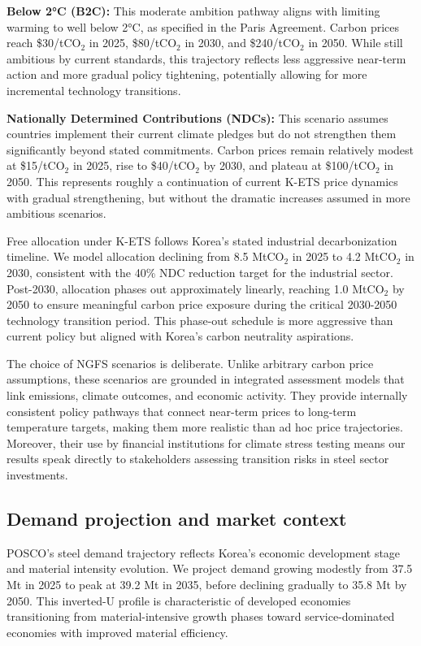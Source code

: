 \documentclass[preprint,1p,authoryear]{elsarticle}
\begin{document}
\textbf{Below 2°C (B2C):} This moderate ambition pathway aligns with limiting warming to well below 2°C, as specified in the Paris Agreement. Carbon prices reach \$30/tCO$_2$ in 2025, \$80/tCO$_2$ in 2030, and \$240/tCO$_2$ in 2050. While still ambitious by current standards, this trajectory reflects less aggressive near-term action and more gradual policy tightening, potentially allowing for more incremental technology transitions.

\textbf{Nationally Determined Contributions (NDCs):} This scenario assumes countries implement their current climate pledges but do not strengthen them significantly beyond stated commitments. Carbon prices remain relatively modest at \$15/tCO$_2$ in 2025, rise to \$40/tCO$_2$ by 2030, and plateau at \$100/tCO$_2$ in 2050. This represents roughly a continuation of current K-ETS price dynamics with gradual strengthening, but without the dramatic increases assumed in more ambitious scenarios.

Free allocation under K-ETS follows Korea's stated industrial decarbonization timeline. We model allocation declining from 8.5 MtCO$_2$ in 2025 to 4.2 MtCO$_2$ in 2030, consistent with the 40\% NDC reduction target for the industrial sector. Post-2030, allocation phases out approximately linearly, reaching 1.0 MtCO$_2$ by 2050 to ensure meaningful carbon price exposure during the critical 2030-2050 technology transition period. This phase-out schedule is more aggressive than current policy but aligned with Korea's carbon neutrality aspirations.

The choice of NGFS scenarios is deliberate. Unlike arbitrary carbon price assumptions, these scenarios are grounded in integrated assessment models that link emissions, climate outcomes, and economic activity. They provide internally consistent policy pathways that connect near-term prices to long-term temperature targets, making them more realistic than ad hoc price trajectories. Moreover, their use by financial institutions for climate stress testing means our results speak directly to stakeholders assessing transition risks in steel sector investments.

\subsection{Demand projection and market context}

POSCO's steel demand trajectory reflects Korea's economic development stage and material intensity evolution. We project demand growing modestly from 37.5 Mt in 2025 to peak at 39.2 Mt in 2035, before declining gradually to 35.8 Mt by 2050. This inverted-U profile is characteristic of developed economies transitioning from material-intensive growth phases toward service-dominated economies with improved material efficiency.
\end{document}
